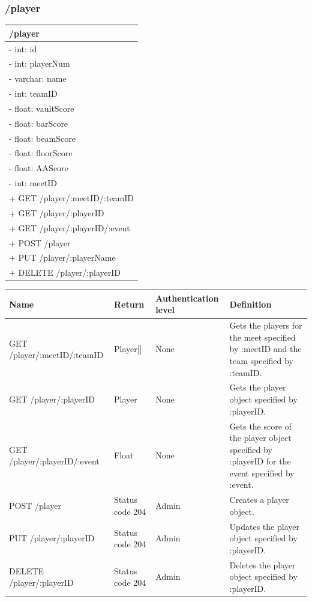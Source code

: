 \documentclass[letterpaper,10pt,draftclsnofoot,onecolumn,]{article}
\begin{document}
\subsubsection{/player}
\begin{center}
    \begin{tabular}{| p{20em} |}
        \hline
        \textbf{/player} \\
        \hline
        - int: id \\
        - int: playerNum \\
        - varchar: name \\
        - int: teamID \\
        - float: vaultScore \\
        - float: barScore \\
        - float: beamScore \\
        - float: floorScore \\
        - float: AAScore \\
        - int: meetID \\
        \hline
        + GET /player/:meetID/:teamID \\
        + GET /player/:playerID \\
        + GET /player/:playerID/:event \\
        + POST /player \\
        + PUT /player/:playerName \\
        + DELETE /player/:playerID \\
        \hline
    \end{tabular}
\end{center}
\begin{center}
    \begin{tabular}{ | p{15em} | p{8em} | p{7em} | p{20em} | }
        \hline
        \textbf{Name} & \textbf{Return} & \textbf{Authentication level} & \textbf{Definition} \\
        \hline
        GET /player/:meetID/:teamID & Player[] & None & Gets the players for the meet specified by :meetID and the team specified by :teamID. \\
        \hline
        GET /player/:playerID & Player & None & Gets the player object specified by :playerID. \\
        \hline
        GET /player/:playerID/:event & Float & None & Gets the score of the player object specified by :playerID for the event specified by :event. \\
        \hline
        POST /player & Status code 204 & Admin & Creates a player object. \\
        \hline
        PUT /player/:playerID & Status code 204 & Admin & Updates the player object specified by :playerID. \\
        \hline
        DELETE /player/:playerID & Status code 204 & Admin & Deletes the player object specified by :playerID. \\
        \hline
    \end{tabular}
\end{center}
\end{document}
